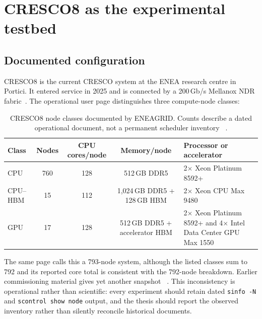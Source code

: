 
\section{CRESCO8 as the experimental testbed}
\label{sec:cresco8}

\subsection{Documented configuration}

CRESCO8 is the current CRESCO system at the ENEA research centre in
Portici.  It entered service in 2025 and is connected by a 200\,Gb/s
Mellanox NDR fabric~\cite{cresco8doc,eneapress}.  The operational user
page distinguishes three compute-node classes:

\begin{table}[tbp]
\centering
\small
\caption{CRESCO8 node classes documented by ENEAGRID.  Counts describe a
dated operational document, not a permanent scheduler inventory
~\cite{cresco8doc}.}
\label{tab:cresco8-node-classes}
\begin{tabularx}{\textwidth}{@{}lcccY@{}}
\toprule
\textbf{Class} & \textbf{Nodes} & \textbf{CPU cores/node}
 & \textbf{Memory/node} & \textbf{Processor or accelerator} \\
\midrule
CPU
 & 760 & 128 & 512\,GB DDR5
 & 2$\times$ Xeon Platinum 8592+ \\
CPU--HBM
 & 15 & 112 & 1,024\,GB DDR5 + 128\,GB HBM
 & 2$\times$ Xeon CPU Max 9480 \\
GPU
 & 17 & 128 & 512\,GB DDR5 + accelerator HBM
 & 2$\times$ Xeon Platinum 8592+ and
   4$\times$ Intel Data Center GPU Max 1550 \\
\bottomrule
\end{tabularx}
\end{table}

The same page calls this a 793-node system, although the listed classes
sum to 792 and its reported core total is consistent with the 792-node
breakdown.  Earlier commissioning material gives yet another snapshot
~\cite{eneacresco8slides}.  This inconsistency is operational rather
than scientific: every experiment should retain dated
\texttt{sinfo -N} and \texttt{scontrol show node} output, and the thesis
should report the observed inventory rather than silently reconcile
historical documents.


